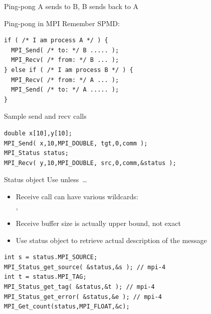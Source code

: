 \begin{numberedframe}{Ping-pong}
  A sends to B, B sends back to A

\end{numberedframe}

\begin{numberedframe}{Ping-pong in MPI}
Remember SPMD:
\lstset{language=C}
\begin{lstlisting}
if ( /* I am process A */ ) {
  MPI_Send( /* to: */ B ..... );
  MPI_Recv( /* from: */ B ... );
} else if ( /* I am process B */ ) {
  MPI_Recv( /* from: */ A ... );
  MPI_Send( /* to: */ A ..... );
}
\end{lstlisting}
\end{numberedframe}

\begin{numberedframe}{Sample send and recv calls}
\begin{lstlisting}
double x[10],y[10];
MPI_Send( x,10,MPI_DOUBLE, tgt,0,comm );
MPI_Status status;
MPI_Recv( y,10,MPI_DOUBLE, src,0,comm,&status );
\end{lstlisting}
\end{numberedframe}


\begin{numberedframe}{Status object}
 Use  unless~\ldots

  \begin{itemize}
  \item Receive call can have various wildcards:\\
    , 
  \item Receive buffer size is actually upper bound, not exact
  \item Use status object to retrieve actual description of the message
  \end{itemize}
\begin{lstlisting}
int s = status.MPI_SOURCE;
MPI_Status_get_source( &status,&s ); // mpi-4
int t = status.MPI_TAG;
MPI_Status_get_tag( &status,&t ); // mpi-4
MPI_Status_get_error( &status,&e ); // mpi-4
MPI_Get_count(status,MPI_FLOAT,&c);
\end{lstlisting}
\end{numberedframe}

\begin{exerciseframe}[pingpong]
  
\end{exerciseframe}

